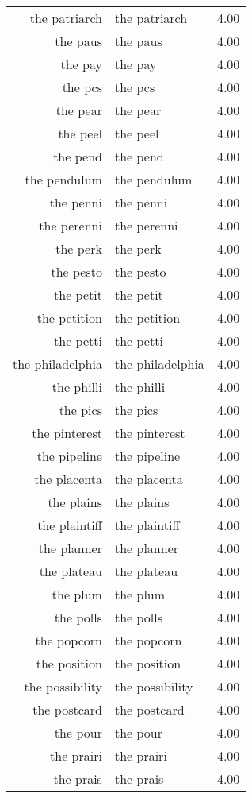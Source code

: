 \begin{table}[ht]
\begin{tabular}{rlr}
  the patriarch & the patriarch & 4.00 \\ 
  the paus & the paus & 4.00 \\ 
  the pay & the pay & 4.00 \\ 
  the pcs & the pcs & 4.00 \\ 
  the pear & the pear & 4.00 \\ 
  the peel & the peel & 4.00 \\ 
  the pend & the pend & 4.00 \\ 
  the pendulum & the pendulum & 4.00 \\ 
  the penni & the penni & 4.00 \\ 
  the perenni & the perenni & 4.00 \\ 
  the perk & the perk & 4.00 \\ 
  the pesto & the pesto & 4.00 \\ 
  the petit & the petit & 4.00 \\ 
  the petition & the petition & 4.00 \\ 
  the petti & the petti & 4.00 \\ 
  the philadelphia & the philadelphia & 4.00 \\ 
  the philli & the philli & 4.00 \\ 
  the pics & the pics & 4.00 \\ 
  the pinterest & the pinterest & 4.00 \\ 
  the pipeline & the pipeline & 4.00 \\ 
  the placenta & the placenta & 4.00 \\ 
  the plains & the plains & 4.00 \\ 
  the plaintiff & the plaintiff & 4.00 \\ 
  the planner & the planner & 4.00 \\ 
  the plateau & the plateau & 4.00 \\ 
  the plum & the plum & 4.00 \\ 
  the polls & the polls & 4.00 \\ 
  the popcorn & the popcorn & 4.00 \\ 
  the position & the position & 4.00 \\ 
  the possibility & the possibility & 4.00 \\ 
  the postcard & the postcard & 4.00 \\ 
  the pour & the pour & 4.00 \\ 
  the prairi & the prairi & 4.00 \\ 
  the prais & the prais & 4.00 \\ 

\end{tabular}
\end{table}
